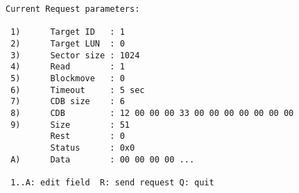\begin{screendump}
  \begin{verbatim}
Current Request parameters:

 1)      Target ID   : 1
 2)      Target LUN  : 0
 3)      Sector size : 1024
 4)      Read        : 1
 5)      Blockmove   : 0
 6)      Timeout     : 5 sec
 7)      CDB size    : 6
 8)      CDB         : 12 00 00 00 33 00 00 00 00 00 00 00
 9)      Size        : 51
         Rest        : 0
         Status      : 0x0
 A)      Data        : 00 00 00 00 ...

 1..A: edit field  R: send request Q: quit
  \end{verbatim}
\end{screendump}
